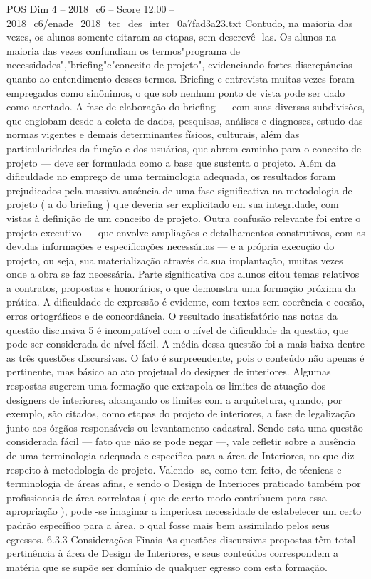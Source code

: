 \begin{textsample}{POS Dim 4 – 2018\_c6 – Score 12.00 – 2018\_c6/enade\_2018\_tec\_des\_inter\_0a7fad3a23.txt}
Contudo, na maioria das vezes, os alunos somente citaram as etapas, sem descrevê -las.
Os alunos na maioria das vezes confundiam os termos"programa de necessidades","briefing"e"conceito de projeto", evidenciando fortes discrepâncias quanto ao entendimento desses termos.
Briefing e entrevista muitas vezes foram empregados como sinônimos, o que sob nenhum ponto de vista pode ser dado como acertado.
A fase de elaboração do briefing — com suas diversas subdivisões, que englobam desde a coleta de dados, pesquisas, análises e diagnoses, estudo das normas vigentes e demais determinantes físicos, culturais, além das particularidades da função e dos usuários, que abrem caminho para o conceito de projeto — deve ser formulada como a base que sustenta o projeto.
Além da dificuldade no emprego de uma terminologia adequada, os resultados foram prejudicados pela massiva ausência de uma fase significativa na metodologia de projeto ( a do briefing ) que deveria ser explicitado em sua integridade, com vistas à definição de um conceito de projeto.
Outra confusão relevante foi entre o projeto executivo — que envolve ampliações e detalhamentos construtivos, com as devidas informações e especificações necessárias — e a própria execução do projeto, ou seja, sua materialização através da sua implantação, muitas vezes onde a obra se faz necessária.
Parte significativa dos alunos citou temas relativos a contratos, propostas e honorários, o que demonstra uma formação próxima da prática.
A dificuldade de expressão é evidente, com textos sem coerência e coesão, erros ortográficos e de concordância.
O resultado insatisfatório nas notas da questão discursiva 5 é incompatível com o nível de dificuldade da questão, que pode ser considerada de nível fácil.
A média dessa questão foi a mais baixa dentre as três questões discursivas.
O fato é surpreendente, pois o conteúdo não apenas é pertinente, mas básico ao ato projetual do designer de interiores.
Algumas respostas sugerem uma formação que extrapola os limites de atuação dos designers de interiores, alcançando os limites com a arquitetura, quando, por exemplo, são citados, como etapas do projeto de interiores, a fase de legalização junto aos órgãos responsáveis ou levantamento cadastral.
Sendo esta uma questão considerada fácil — fato que não se pode negar —, vale refletir sobre a ausência de uma terminologia adequada e específica para a área de Interiores, no que diz respeito à metodologia de projeto.
Valendo -se, como tem feito, de técnicas e terminologia de áreas afins, e sendo o Design de Interiores praticado também por profissionais de área correlatas ( que de certo modo contribuem para essa apropriação ), pode -se imaginar a imperiosa necessidade de estabelecer um certo padrão específico para a área, o qual fosse mais bem assimilado pelos seus egressos. 6.3.3 Considerações Finais As questões discursivas propostas têm total pertinência à área de Design de Interiores, e seus conteúdos correspondem a matéria que se supõe ser domínio de qualquer egresso com esta formação.

\end{textsample}

